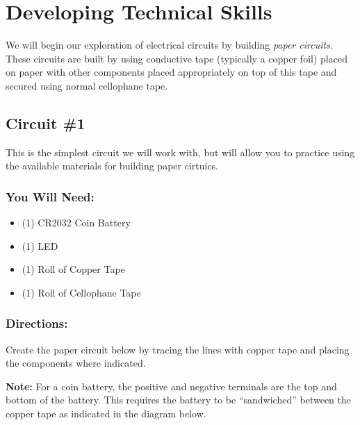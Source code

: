     \pagebreak

    \section{Developing Technical Skills}
    We will begin our exploration of electrical circuits by building \emph{paper circuits}. These circuits are built by using conductive tape (typically a copper foil) placed on paper with other components placed appropriately on top of this tape and secured using normal cellophane tape.

    \subsection{Circuit \#1}
    This is the simplest circuit we will work with, but will allow you to practice using the available materials for building paper cirtuics.

    \subsubsection*{You Will Need:}
    \begin{itemize}[noitemsep]\small
        \item (1) CR2032 Coin Battery
        \item (1) LED
        \item (1) Roll of Copper Tape
        \item (1) Roll of Cellophane Tape
    \end{itemize}

    \subsubsection*{Directions:}
    Create the paper circuit below by tracing the lines with copper tape and placing the components where indicated.

    \medskip
    \textbf{Note:} For a coin battery, the positive and negative terminals are the top and bottom of the battery. This requires the battery to be ``sandwiched'' between the copper tape as indicated in the diagram below.

